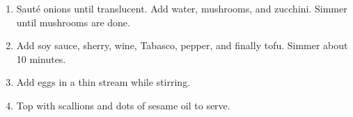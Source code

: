 
\begin{ingredients}
\end{ingredients}


\begin{recipe}
  \begin{enumerate}

  \item Saut\'e onions until translucent.  Add water, mushrooms, and
  zucchini.  Simmer until mushrooms are done.

  \item Add soy sauce, sherry, wine, Tabasco, pepper, and finally
  tofu.  Simmer about 10 minutes.

\item Add eggs in a thin stream while stirring.

\item Top with scallions and dots of sesame oil to serve.

  \end{enumerate}
\end{recipe}
